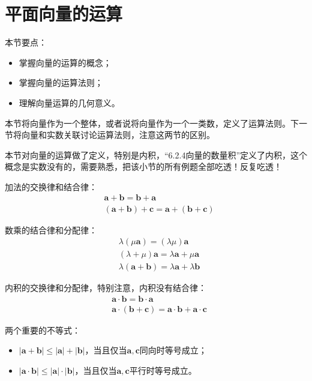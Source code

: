 \section{平面向量的运算}

本节要点：
\begin{itemize}
    \item 掌握向量的运算的概念；
    \item 掌握向量的运算法则；
    \item 理解向量运算的几何意义。
\end{itemize}

\begin{tcolorbox}
本节将向量作为一个整体，或者说将向量作为一个一类数，定义了运算法则。下一节将向量和实数关联讨论运算法则，注意这两节的区别。
\end{tcolorbox}

本节对向量的运算做了定义，特别是内积，“6.2.4向量的数量积”定义了内积，这个概念是实数没有的，需要熟悉，把该小节的所有例题全部吃透！反复吃透！

加法的交换律和结合律：
\begin{align*}
&\boldsymbol{a}+\boldsymbol{b}=\boldsymbol{b}+\boldsymbol{a} \\
&\left( \boldsymbol{a}+\boldsymbol{b} \right) +\boldsymbol{c}=\boldsymbol{a}+\left( \boldsymbol{b}+\boldsymbol{c} \right)
\end{align*}

数乘的结合律和分配律：
\begin{align*}
&\lambda \left( \mu \boldsymbol{a} \right) =\left( \lambda \mu \right) \boldsymbol{a} \\
&\left( \lambda +\mu \right) \boldsymbol{a}=\lambda \boldsymbol{a}+\mu \boldsymbol{a} \\
&\lambda \left( \boldsymbol{a}+\boldsymbol{b} \right) =\lambda \boldsymbol{a}+\lambda \boldsymbol{b}
\end{align*}

内积的交换律和分配律，特别注意，内积没有结合律：
\begin{align*}
&\boldsymbol{a}\cdot \boldsymbol{b}=\boldsymbol{b}\cdot \boldsymbol{a} \\
&\boldsymbol{a}\cdot \left( \boldsymbol{b}+\boldsymbol{c} \right) =\boldsymbol{a}\cdot \boldsymbol{b}+\boldsymbol{a}\cdot \boldsymbol{c}
\end{align*}

两个重要的不等式：
\begin{itemize}
    \item $\left| \boldsymbol{a}+\boldsymbol{b} \right|\leqslant \left| \boldsymbol{a} \right|+\left| \boldsymbol{b} \right|$，当且仅当$\boldsymbol{a},\boldsymbol{c}$同向时等号成立；
    \item $\left| \boldsymbol{a}\cdot \boldsymbol{b} \right|\leqslant \left| \boldsymbol{a} \right|\cdot \left| \boldsymbol{b} \right|$，当且仅当$\boldsymbol{a},\boldsymbol{c}$平行时等号成立。
\end{itemize}

